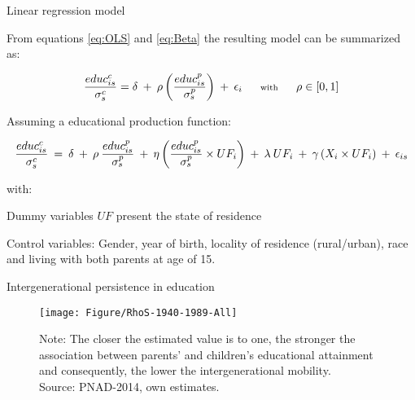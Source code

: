 \documentclass{beamer}
\begin{document}
\begin{frame} {Linear regression model}
\begin{itemize} 
{\footnotesize\item From equations \eqref{eq:OLS} and \eqref{eq:Beta} the resulting model can be summarized as:}


\begin{equation} \label{eq:OLSRho}
\scriptsize\frac{educ^c_{is}}{\sigma^c_s}=\delta \:+\: \rho \left(\frac{educ^p_{is}}{\sigma^p_s}\right) \:+\: \epsilon_i \qquad \textrm{with} \qquad \rho \in [0,1] 
\end{equation}

\hfill \break
{\footnotesize\item Assuming a educational production function:}

\begin{equation} \label{eq:OLSFixed}
\scriptsize\frac{educ^c_{is}}{\sigma^c_s} \:=\: \delta \:+\: \rho \: \frac{educ^p_{is}}{\sigma^p_s} \:+\: \eta \left(\frac{educ^p_{is}}{\sigma^p_s} \times UF_i \right) \:+\: \lambda \: UF_i \:+\: \gamma \left(X_i \times UF_i \right) \:+\: \epsilon_{is}
\end{equation}


{\scriptsize with:}
\begin{itemize}
{\scriptsize\item Dummy variables $UF$ present the state of residence}
{\scriptsize\item Control variables: Gender, year of birth, locality of residence (rural/urban), race and living with both parents at age of 15.} 
\end{itemize}
\end{itemize}
\end{frame}






\begin{frame} [label=main2]{Intergenerational persistence in education \hyperlink{Evolution}{\beamerbutton {\textcolor{red}{Evolution over Time}}}}
\begin{figure}[htb]
\centering
\texttt{[image: Figure/RhoS-1940-1989-All]}
\begin{minipage}{0.84\textwidth} %
{\fontsize{5}{1}\selectfont
\vspace*{-1mm} 
Note: The closer the estimated value is to one, the stronger the association between parents' and children's educational attainment and consequently, the lower the intergenerational mobility. \\
Source: PNAD-2014, own estimates.\par}
\end{minipage}
\end{figure}
\end{frame}
\end{document}
